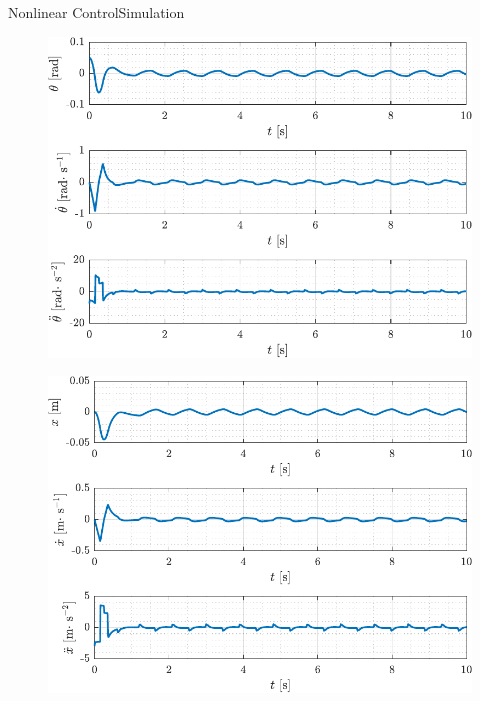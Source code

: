 \begin{frame}{Nonlinear Control}{Simulation}
  \hspace{-.9cm}
  \begin{minipage}{\textwidth}
    \begin{minipage}{0.56\textwidth}
      \begin{figure}[H]
        \includegraphics[width=\textwidth]{figures/slidingModeSIMtheta}
      \end{figure}
    \end{minipage}
    \begin{minipage}{0.56\textwidth}
      \begin{figure}[H]
        \includegraphics[width=\textwidth]{figures/slidingModeSIMx}
      \end{figure}
    \end{minipage}
  \end{minipage}
\end{frame}


